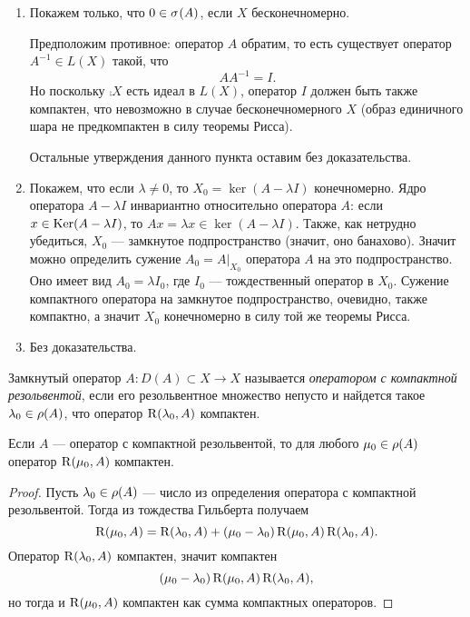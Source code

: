 \begin{proofbreak}
    \begin{enumerate}
        \item  Покажем только, что $0 \in \spectrum{A}$, если $X$ бесконечномерно. 

        Предположим противное:     оператор $A$ обратим, то есть существует оператор 
        $A^{-1} \in L(X)$ такой, что
        \[ AA^{-1} = I. \]
        Но поскольку $\comp{X}$ есть идеал в $L(X)$, оператор $I$ должен быть также компактен, что
        невозможно в случае бесконечномерного $X$ (образ единичного шара не предкомпактен в силу 
        теоремы Рисса).

        Остальные утверждения данного пункта оставим без доказательства.

        \item Покажем, что если $\lambda \neq 0$, то $X_0 = \ker(A - \lambda I)$ конечномерно.
        Ядро оператора $A - \lambda I$ инвариантно относительно оператора $A$: если 
        $x \hm\in \ker (A \hm- \lambda I)$, то $Ax = \lambda x \in \ker (A - \lambda I)$.
        Также, как нетрудно убедиться, $X_0$ --- замкнутое подпространство (значит, оно банахово).
        Значит можно определить сужение $A_0 = A|_{X_0}$ оператора $A$ на это подпространство.
        Оно имеет вид $A_0 = \lambda I_{0}$, где $I_0$ --- тождественный оператор в $X_0$. 
        Сужение компактного оператора на замкнутое подпространство, очевидно, также
        компактно, а значит $X_0$ конечномерно в силу той же теоремы Рисса.

        \item Без доказательства.
    \end{enumerate}
\end{proofbreak}

\begin{definition}
    Замкнутый оператор $A \colon D(A) \subset X \to X$ называется \emph{оператором с компактной 
    резольвентой}, если его резольвентное множество непусто и найдется такое 
    $\lambda_0 \in \operatorname{\rho}(A)$, что оператор $\operatorname{R}(\lambda_0, A)$ компактен.
\end{definition}

\begin{lemma}
    Если $A$ --- оператор с компактной резольвентой, то для любого $\mu_0 \in \operatorname{\rho}(A)$ оператор
    $\operatorname{R}(\mu_0, A)$ компактен.
\end{lemma}

\begin{proof}
    Пусть $\lambda_0 \in \operatorname{\rho}(A)$ --- число из определения оператора с компактной резольвентой.
    Тогда из тождества Гильберта получаем
    \[ \operatorname{R}(\mu_0, A) = \operatorname{R}(\lambda_0, A) + (\mu_0 - \lambda_0)\operatorname{R}(\mu_0, A)
        \operatorname{R}(\lambda_0, A). \]
    Оператор $\operatorname{R}(\lambda_0, A)$ компактен, значит компактен
    \[(\mu_0 - \lambda_0)\operatorname{R}(\mu_0, A)\operatorname{R}(\lambda_0, A),\]
    но тогда и $\operatorname{R}(\mu_0, A)$ компактен как сумма компактных операторов.
\end{proof}

